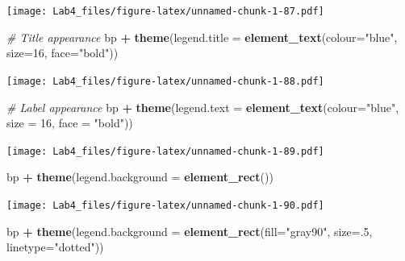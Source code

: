 \documentclass[]{article}
\newenvironment{Shaded}{\begin{snugshade}}{\end{snugshade}}
\newcommand{\KeywordTok}[1]{\textcolor[rgb]{0.13,0.29,0.53}{\textbf{#1}}}
\newcommand{\DataTypeTok}[1]{\textcolor[rgb]{0.13,0.29,0.53}{#1}}
\newcommand{\DecValTok}[1]{\textcolor[rgb]{0.00,0.00,0.81}{#1}}
\newcommand{\StringTok}[1]{\textcolor[rgb]{0.31,0.60,0.02}{#1}}
\newcommand{\CommentTok}[1]{\textcolor[rgb]{0.56,0.35,0.01}{\textit{#1}}}
\newcommand{\OperatorTok}[1]{\textcolor[rgb]{0.81,0.36,0.00}{\textbf{#1}}}
\newcommand{\NormalTok}[1]{#1}
\begin{document}
\texttt{[image: Lab4\_files/figure-latex/unnamed-chunk-1-87.pdf]}

\begin{Shaded}
\begin{Highlighting}[]
\CommentTok{# Title appearance}
\NormalTok{bp }\OperatorTok{+}\StringTok{ }\KeywordTok{theme}\NormalTok{(}\DataTypeTok{legend.title =} \KeywordTok{element_text}\NormalTok{(}\DataTypeTok{colour=}\StringTok{"blue"}\NormalTok{, }\DataTypeTok{size=}\DecValTok{16}\NormalTok{, }\DataTypeTok{face=}\StringTok{"bold"}\NormalTok{))}
\end{Highlighting}
\end{Shaded}

\texttt{[image: Lab4\_files/figure-latex/unnamed-chunk-1-88.pdf]}

\begin{Shaded}
\begin{Highlighting}[]
\CommentTok{# Label appearance}
\NormalTok{bp }\OperatorTok{+}\StringTok{ }\KeywordTok{theme}\NormalTok{(}\DataTypeTok{legend.text =} \KeywordTok{element_text}\NormalTok{(}\DataTypeTok{colour=}\StringTok{"blue"}\NormalTok{, }\DataTypeTok{size =} \DecValTok{16}\NormalTok{, }\DataTypeTok{face =} \StringTok{"bold"}\NormalTok{))}
\end{Highlighting}
\end{Shaded}

\texttt{[image: Lab4\_files/figure-latex/unnamed-chunk-1-89.pdf]}

\begin{Shaded}
\begin{Highlighting}[]
\NormalTok{bp }\OperatorTok{+}\StringTok{ }\KeywordTok{theme}\NormalTok{(}\DataTypeTok{legend.background =} \KeywordTok{element_rect}\NormalTok{())}
\end{Highlighting}
\end{Shaded}

\texttt{[image: Lab4\_files/figure-latex/unnamed-chunk-1-90.pdf]}

\begin{Shaded}
\begin{Highlighting}[]
\NormalTok{bp }\OperatorTok{+}\StringTok{ }\KeywordTok{theme}\NormalTok{(}\DataTypeTok{legend.background =} \KeywordTok{element_rect}\NormalTok{(}\DataTypeTok{fill=}\StringTok{"gray90"}\NormalTok{, }\DataTypeTok{size=}\NormalTok{.}\DecValTok{5}\NormalTok{, }\DataTypeTok{linetype=}\StringTok{"dotted"}\NormalTok{))}
\end{Highlighting}
\end{Shaded}
\end{document}
